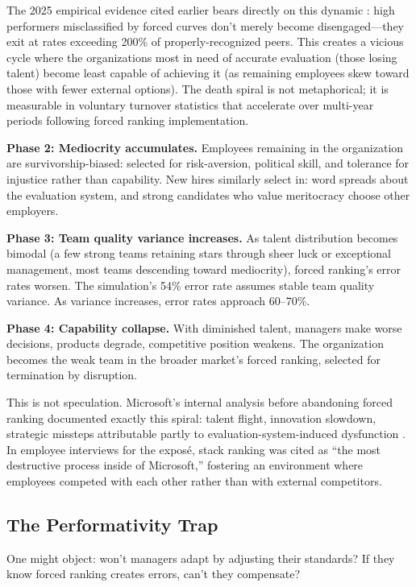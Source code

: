 \documentclass[12pt]{article}
\begin{document}
The 2025 empirical evidence cited earlier bears directly on this dynamic \citep{informs2025talent}: high performers misclassified by forced curves don't merely become disengaged---they exit at rates exceeding 200\% of properly-recognized peers. This creates a vicious cycle where the organizations most in need of accurate evaluation (those losing talent) become least capable of achieving it (as remaining employees skew toward those with fewer external options). The death spiral is not metaphorical; it is measurable in voluntary turnover statistics that accelerate over multi-year periods following forced ranking implementation.


\textbf{Phase 2: Mediocrity accumulates.} Employees remaining in the organization are survivorship-biased: selected for risk-aversion, political skill, and tolerance for injustice rather than capability. New hires similarly select in: word spreads about the evaluation system, and strong candidates who value meritocracy choose other employers.

\textbf{Phase 3: Team quality variance increases.} As talent distribution becomes bimodal (a few strong teams retaining stars through sheer luck or exceptional management, most teams descending toward mediocrity), forced ranking's error rates worsen. The simulation's 54\% error rate assumes stable team quality variance. As variance increases, error rates approach 60--70\%.

\textbf{Phase 4: Capability collapse.} With diminished talent, managers make worse decisions, products degrade, competitive position weakens. The organization becomes the weak team in the broader market's forced ranking, selected for termination by disruption.

This is not speculation. Microsoft's internal analysis before abandoning forced ranking documented exactly this spiral: talent flight, innovation slowdown, strategic missteps attributable partly to evaluation-system-induced dysfunction \citep{eichenwald2012microsoft}. In employee interviews for the exposé, stack ranking was cited as ``the most destructive process inside of Microsoft,'' fostering an environment where employees competed with each other rather than with external competitors.

\subsection{The Performativity Trap}

One might object: won't managers adapt by adjusting their standards? If they know forced ranking creates errors, can't they compensate?
\end{document}

